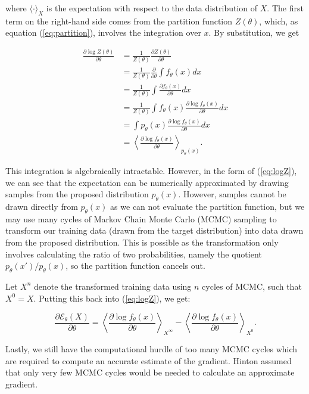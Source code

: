 \documentclass[11pt]{article}
\begin{document}
where $\langle\cdot\rangle_X$ is the expectation with respect to the data distribution of $X$. The first term on the right-hand side comes from the partition function $Z(\theta)$, which, as equation (\ref{eq:partition}), involves the integration over $x$. By substitution, we get

\begin{align}
\frac{\partial\log Z(\theta)}{\partial\theta}
&= \frac{1}{Z(\theta)}\frac{\partial Z(\theta)}{\partial\theta}\\
&= \frac{1}{Z(\theta)}\frac{\partial}{\partial\theta}\int f_\theta(x)dx\\
&= \frac{1}{Z(\theta)}\int \frac{\partial f_\theta(x)}{\partial\theta} dx\\
&= \frac{1}{Z(\theta)}\int f_\theta(x)\frac{\partial\log f_\theta(x)}{\partial\theta}dx\\
&= \int p_\theta(x) \frac{\partial\log f_\theta(x)}{\partial\theta}dx\\
&= \left\langle \frac{\partial\log f_\theta (x)}{\partial\theta} \right\rangle_{p_\theta(x)}. \label{eq:logZ}
\end{align}

This integration is algebraically intractable. However, in the form of (\ref{eq:logZ}), we can see that the expectation can be numerically approximated by drawing samples from the proposed distribution $p_\theta (x)$. However, samples cannot be drawn directly from $p_\theta(x)$ as we can not evaluate the partition function, but we may use many cycles of Markov Chain Monte Carlo (MCMC) sampling to transform our training data (drawn from the target distribution) into data drawn from the proposed distribution. This is possible as the transformation only involves calculating the ratio of two probabilities, namely the quotient $p_\theta(x') / p_\theta(x)$, so the partition function cancels out.

Let $X^n$ denote the transformed training data using $n$ cycles of MCMC, such that $X^0 = X$. Putting this back into (\ref{eq:logZ}), we get:

\begin{equation}
\frac{\partial\mathcal{E}_\theta (X)}{\partial\theta} = \left\langle \frac{\partial\log f_\theta(x)}{\partial\theta} \right\rangle_{X^\infty} - \left\langle \frac{\partial\log f_\theta (x)}{\partial\theta} \right\rangle_{X^0}.
\end{equation}

Lastly, we still have the computational hurdle of too many MCMC cycles which are required to compute an accurate estimate of the gradient. Hinton assumed that only very few MCMC cycles would be needed to calculate an approximate gradient.
\end{document}
